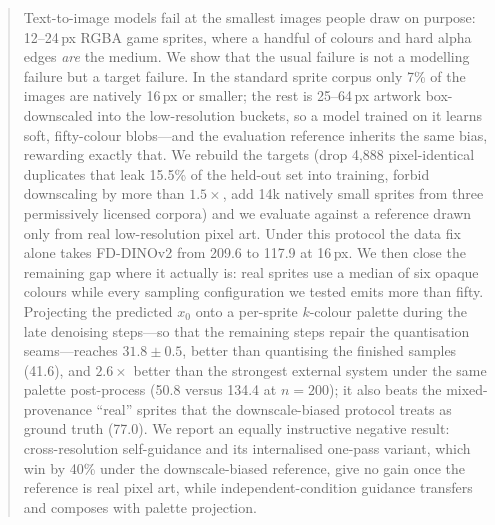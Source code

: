 \begin{abstract}
Text-to-image models fail at the smallest images people draw on purpose: 12--24\,px RGBA game sprites, where a
handful of colours and hard alpha edges \emph{are} the medium. We show that the usual failure is not a modelling
failure but a target failure. In the standard sprite corpus only 7\% of the images are natively 16\,px or smaller;
the rest is 25--64\,px artwork box-downscaled into the low-resolution buckets, so a model trained on it learns soft,
fifty-colour blobs---and the evaluation reference inherits the same bias, rewarding exactly that. We rebuild the
targets (drop 4{,}888 pixel-identical duplicates that leak 15.5\% of the held-out set into training, forbid
downscaling by more than $1.5\times$, add 14k natively small sprites from three permissively licensed corpora) and we
evaluate against a reference drawn only from real low-resolution pixel art. Under this protocol the data fix alone
takes FD-DINOv2 from 209.6 to 117.9 at 16\,px. We then close the remaining gap where it actually is: real sprites use
a median of six opaque colours while every sampling configuration we tested emits more than fifty. Projecting the
predicted $x_0$ onto a per-sprite $k$-colour palette during the late denoising steps---so that the remaining steps
repair the quantisation seams---reaches $31.8\pm0.5$, better than quantising the finished samples (41.6), and
$2.6\times$ better than the strongest external system under the same palette post-process (50.8 versus 134.4 at
$n{=}200$); it also beats the mixed-provenance ``real'' sprites that the downscale-biased protocol treats as ground
truth (77.0). We report an equally instructive negative result: cross-resolution self-guidance and its internalised
one-pass variant, which win by 40\% under the downscale-biased reference, give no gain once the reference is real
pixel art, while independent-condition guidance transfers and composes with palette projection.
\end{abstract}
